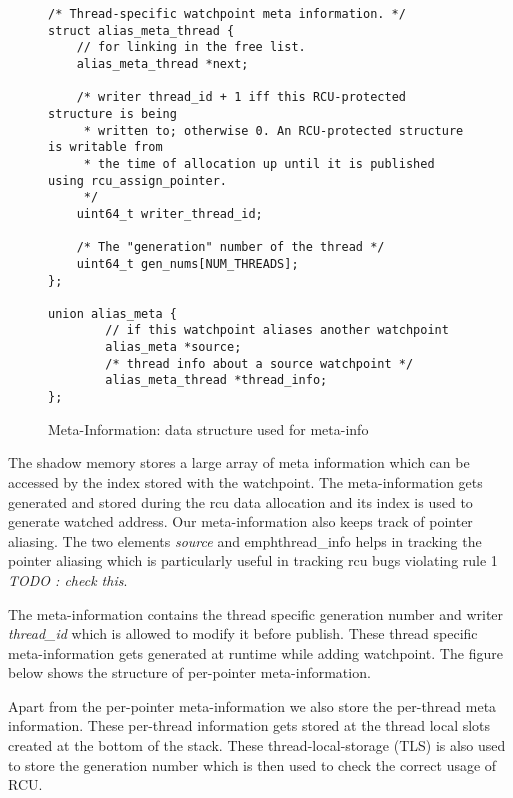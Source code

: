 \begin{figure*}[h]
\begin{lstlisting}
/* Thread-specific watchpoint meta information. */
struct alias_meta_thread {
    // for linking in the free list.
    alias_meta_thread *next;

    /* writer thread_id + 1 iff this RCU-protected structure is being
     * written to; otherwise 0. An RCU-protected structure is writable from
     * the time of allocation up until it is published using rcu_assign_pointer.
     */
    uint64_t writer_thread_id;

    /* The "generation" number of the thread */
    uint64_t gen_nums[NUM_THREADS];
};

union alias_meta {
        // if this watchpoint aliases another watchpoint
        alias_meta *source;
        /* thread info about a source watchpoint */
        alias_meta_thread *thread_info;
}; 
\end{lstlisting}
\caption{Meta-Information: data structure used for meta-info}\label{fig:metainfo}
\end{figure*}

The shadow memory stores a large array of meta information which can be accessed by the index stored with the watchpoint. The meta-information gets generated and stored during the rcu data allocation and its index is used to generate watched address. Our meta-information also keeps track of pointer aliasing. The two elements \emph{source} and emph{thread\_info} helps in tracking the pointer aliasing which is particularly useful in tracking rcu bugs violating rule 1 \emph{TODO : check this}. 

The meta-information contains the thread specific generation number and writer \emph{thread\_id} which is allowed to modify it before publish. These thread specific meta-information gets generated at runtime while adding watchpoint. The figure below shows the structure of per-pointer meta-information. 

Apart from the per-pointer meta-information we also store the per-thread meta information. These per-thread information gets stored at the thread local slots created at the bottom of the stack. These thread-local-storage (TLS) is also used to store the generation number which is then used to check the correct usage of RCU.


